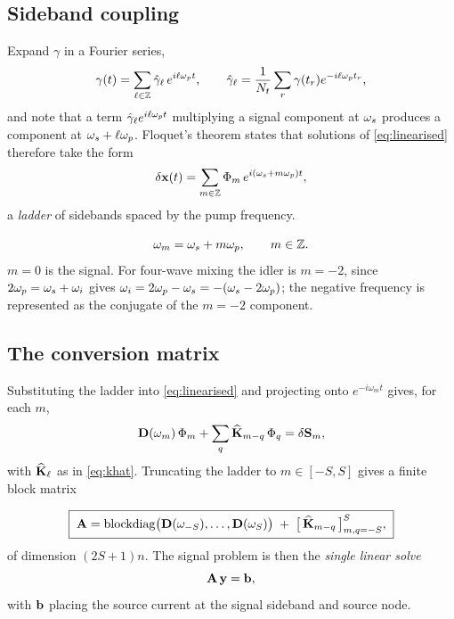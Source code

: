 \subsection{Sideband coupling}

Expand $\gamma$ in a Fourier series,
\begin{equation}
  \gamma(t) = \sum_{\ell\in\mathbb{Z}} \hat{\gamma}_\ell\,e^{i\ell\omega_{p} t},
  \qquad
  \hat{\gamma}_\ell = \frac{1}{N_t}\sum_{r}\gamma(t_r)e^{-i\ell\omega_{p} t_r},
\end{equation}
and note that a term $\hat{\gamma}_\ell e^{i\ell\omega_{p} t}$ multiplying a signal component
at $\omega_{s}$ produces a component at $\omega_{s} + \ell\omega_{p}$. Floquet's theorem states that
solutions of \eqref{eq:linearised} therefore take the form
\begin{equation}
  \delta\mathbf{x}(t) = \sum_{m\in\mathbb{Z}} \Phi_m\,e^{i(\omega_{s} + m\omega_{p})t},
\end{equation}
a \emph{ladder} of sidebands spaced by the pump frequency.

\begin{definition}
\begin{equation}
  \omega_m = \omega_{s} + m\omega_{p},\qquad m\in\mathbb{Z}.
\end{equation}
$m=0$ is the signal. For four-wave mixing the idler is $m=-2$, since
$2\omega_{p} = \omega_{s} + \omega_{i}$ gives $\omega_{i} = 2\omega_{p} - \omega_{s} = -(\omega_{s} - 2\omega_{p})$; the negative
frequency is represented as the conjugate of the $m=-2$ component.
\end{definition}

\subsection{The conversion matrix}

Substituting the ladder into \eqref{eq:linearised} and projecting onto
$e^{-i\omega_m t}$ gives, for each $m$,
\begin{equation}
  \mathbf{D}(\omega_m)\,\Phi_m
  + \sum_{q}\widehat{\mathbf{K}}_{m-q}\,\Phi_q
  = \delta\mathbf{S}_m ,
\end{equation}
with $\widehat{\mathbf{K}}_\ell$ as in \eqref{eq:khat}. Truncating the ladder to
$m\in[-S,S]$ gives a finite block matrix

\begin{equation}
  \boxed{\;
  \mathbf{A}
  = \operatorname{blockdiag}\bigl(\mathbf{D}(\omega_{-S}),\dots,\mathbf{D}(\omega_{S})\bigr)
  \;+\;
  \bigl[\,\widehat{\mathbf{K}}_{m-q}\,\bigr]_{m,q=-S}^{S},
  \;}
  \label{eq:conversion-matrix}
\end{equation}
of dimension $(2S+1)n$. The signal problem is then the \emph{single linear
solve}
\begin{equation}
  \mathbf{A}\,\mathbf{y} = \mathbf{b},
  \label{eq:signal-solve}
\end{equation}
with $\mathbf{b}$ placing the source current at the signal sideband and source
node.


